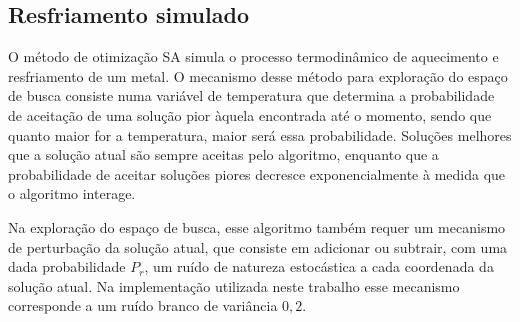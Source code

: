 \subsection{Resfriamento simulado}

O  método de otimização \acf{SA} simula o processo termodinâmico de aquecimento e resfriamento de um metal. O mecanismo desse método para exploração do espaço de busca consiste numa variável de temperatura que determina a probabilidade de aceitação de uma solução pior àquela encontrada até o momento, sendo que quanto maior for a temperatura, maior será essa probabilidade. Soluções melhores que a solução atual são sempre aceitas pelo algoritmo, enquanto que a probabilidade de aceitar soluções piores decresce exponencialmente à medida que o algoritmo interage.  

Na exploração do espaço de busca, esse algoritmo também requer um mecanismo de perturbação da solução atual, que consiste em adicionar ou subtrair, com uma dada probabilidade $P_r$, um ruído de natureza estocástica a cada coordenada da solução atual. Na implementação utilizada neste trabalho esse mecanismo corresponde a um ruído branco de variância $0,2$.

\begin{comment}
\begin{algorithm}[ht]
\caption{Simulated Annealing}
\label{alg:sa}
\begin{algorithmic}
\Require $N\text{,}\:M\text{,}\:T_0\text{,}\:P\text{,}\:L> 0$, $:\alpha\text{,}\:\kappa\text{,}\:P_r \in [0,1]$, $\:COST$.
\Ensure The best found solution that minimizes $COST$.

\Function{DISTURB}{$\boldsymbol{v}$}
\State $f \gets$ \Call{$COST$}{$\boldsymbol{v}$}
\For{$i = 0,\:1,\:\cdots,\:M-1$} 
\If {$P_r > U(0,1)$}
\State $aux \gets v[i]$
\State $v[i] \gets v[i]+ \kappa.(1+f).\mathcal{N}(0,1).v[i]$
\If {$v[i] \notin [0.125,125.5]$}
\State $v[i] \gets aux$
\EndIf
\EndIf
\EndFor
\State \Return $\boldsymbol{v}$
\EndFunction

\State $i \gets 1$, $n \gets 0$,$T \gets T_0$
\For{$j = 0,\:1,\:\cdots,\:M-1$} 
\State $s[j] \gets U(0.125,125.5)$
\EndFor
\State $fit \gets$ \Call{$COST$}{$\boldsymbol{s}$} 
\Repeat
\State $\boldsymbol{s_d} \gets$ \Call{$Disturb$}{$\boldsymbol{s}$}
\State $\delta \gets$ \Call{$COST$}{$\boldsymbol{s_d}$}$- fit$ 
\If {$\delta < 0$ or $\exp{(\frac{\delta}{T})} > U(0,1)$}
\State $\boldsymbol{s} \gets \boldsymbol{s_d}$,$fit \gets $ \Call{$COST$}{$\boldsymbol{s_d}$}
$n \gets n + 1$
\EndIf
\State $i \gets i + 1$
\Until{$i > P$ or $n > L$}
\State $T \gets \alpha.T$
\end{algorithmic}
\end{algorithm}
\end{comment}

